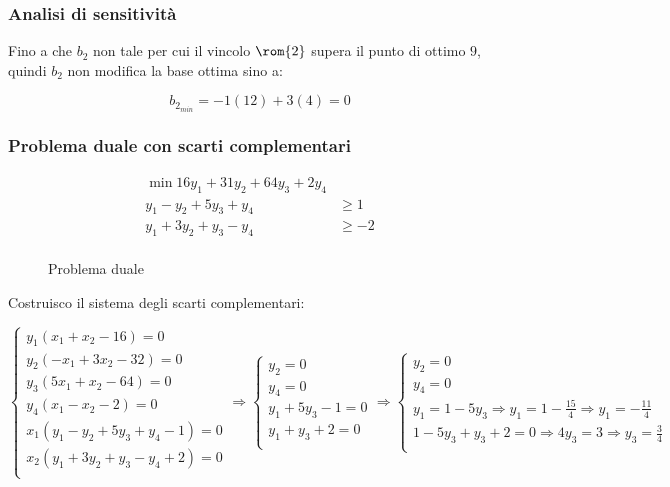 \documentclass[\main/main.tex]{subfiles}
\begin{document}
\subsubsection*{Analisi di sensitività}
Fino a che $b_2$ non tale per cui il vincolo $\rom{2}$ supera il punto di ottimo $9$, quindi $b_2$ non modifica la base ottima sino a:

\[
  b_{2_{min}} = -1(12) + 3(4) = 0
\]

\subsubsection*{Problema duale con scarti complementari}

\begin{figure}
  \begin{align*}
    \min 16y_1 + 31y_2 + 64y_3 + 2y_4 \\
    y_1 -y_2 + 5y_3 + y_4 & \geq 1    \\
    y_1 +3y_2 + y_3 - y_4 & \geq -2   \\
  \end{align*}
  \caption{Problema duale}
\end{figure}

Costruisco il sistema degli scarti complementari:

\[
  \begin{cases}
    y_1(x_1+x_2-16)=0              \\
    y_2(-x_1+3x_2-32)=0            \\
    y_3(5x_1+x_2-64)=0             \\
    y_4(x_1-x_2-2)=0               \\
    x_1(y_1 -y_2 + 5y_3 + y_4-1)=0 \\
    x_2(y_1 +3y_2 + y_3 - y_4+2)=0 \\
  \end{cases}
  \Rightarrow
  \begin{cases}
    y_2=0          \\
    y_4=0          \\
    y_1 + 5y_3-1=0 \\
    y_1 + y_3+2=0  \\
  \end{cases}
  \Rightarrow
  \begin{cases}
    y_2=0                                                                       \\
    y_4=0                                                                       \\
    y_1=1-5y_3 \Rightarrow y_1 = 1-\frac{15}{4} \Rightarrow y_1 = -\frac{11}{4} \\
    1-5y_3 + y_3+2=0 \Rightarrow 4y_3 = 3 \Rightarrow y_3 = \frac{3}{4}         \\
  \end{cases}
\]
\end{document}

